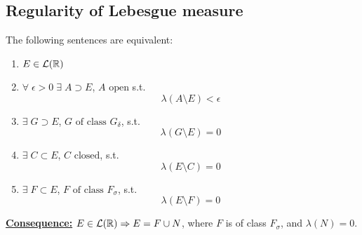 \subsection{Regularity of Lebesgue measure}
\begin{theorem}
    The following sentences are equivalent:
    \begin{enumerate}
        \item \(E \in \mathcal{L}(\mathbb{R})\)
        \item \(\forall \; \epsilon > 0 \; \exists \; A \supset E\), \(A \mbox{ open}\) s.t.
        \[
            \lambda \left(A \setminus E\right) < \epsilon
        \]
        \item \(\exists \; G \supset E\), \(G \mbox{ of class } G_{\delta}\), s.t. 
        \[
            \lambda(G\setminus E) = 0
        \]
        \item \(\exists \; C \subset E\), \(C \mbox{ closed}\), s.t. 
        \[
            \lambda(E\setminus C) = 0
        \]
        \item \(\exists \; F \subset E\), \(F \mbox{ of class } F_{\sigma}\), s.t. 
        \[
            \lambda(E\setminus F) = 0
        \]
    \end{enumerate}
\end{theorem}
\noindent\underline{\textbf{Consequence:}} \(E \in \mathcal{L}(\mathbb{R}) \Rightarrow E = F \cup N\), where \(F\) is of class \(F_{\sigma}\), and \(\lambda(N) = 0\).
